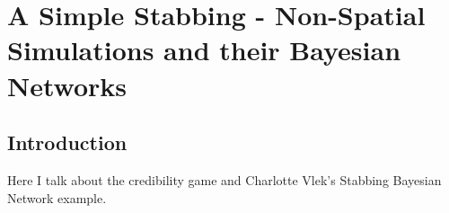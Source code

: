  

\chapter[Simple Non-Spatial Simulations]{A Simple Stabbing - Non-Spatial Simulations and their Bayesian Networks}

\section{Introduction}
Here I talk about the credibility game and Charlotte Vlek's Stabbing Bayesian Network example.
